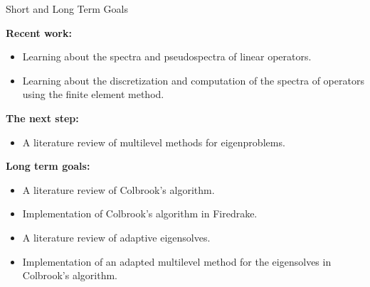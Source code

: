 \documentclass[aspectratio=169]{beamer}
\begin{document}
\begin{frame}{Short and Long Term Goals}

\textbf{Recent work:}
\begin{itemize}
    \item Learning about the spectra and pseudospectra of linear operators.
    \item Learning about the discretization and computation of the spectra of operators using the finite element method. 
\end{itemize}



\textbf{The next step:}
\begin{itemize}
    \item A literature review of multilevel methods for eigenproblems.
\end{itemize}
\textbf{Long term goals:}
\begin{itemize}
     \item A literature review of Colbrook's algorithm.
     \item Implementation of Colbrook's algorithm in Firedrake.
     \item A literature review of adaptive eigensolves.
     \item Implementation of an adapted multilevel method for the eigensolves in Colbrook's algorithm.
\end{itemize}
\end{frame}
\end{document}
